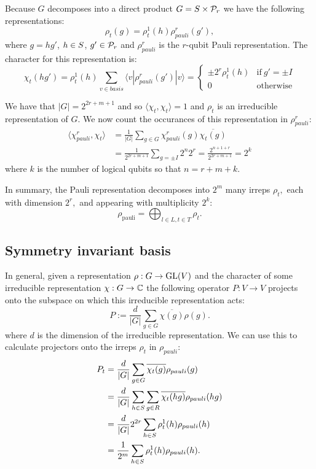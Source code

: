 \documentclass[12pt]{article}
\begin{document}
Because $G$ decomposes 
into a direct product $G=S\times \mathcal{P}_r$ we have the
following representations:
$$
    \rho_t(g) = \rho^1_t(h) \rho^r_{pauli}(g'),
$$
where $g=hg'$, $h\in S$, $g'\in \mathcal{P}_r$ 
and $\rho^r_{pauli}$ is the $r$-qubit Pauli representation.
The character for this representation is:
$$
\chi_{t}(hg') = \rho_t^1(h) \sum_{v \in basis} \langle v | \rho^r_{{pauli}}(g') | v \rangle
    = \left\{ \begin{array}{ll}
 \pm 2^r\rho_t^1(h) &\mbox{if}\ g'=\pm I\\
 0 &\mbox{otherwise}\end{array}\right.
$$

We have that $|G|=2^{2r+m+1}$ and so
$\langle\chi_{t},\chi_{t}\rangle = 1$ and
$\rho_t$ is an irreducible representation of $G.$
We now count the occurances of 
this representation in $\rho^r_{pauli}$:
\begin{align*}
\langle\chi^r_{pauli},\chi_{t}\rangle &= \frac{1}{|G|}\sum_{g\in G} \chi^r_{pauli}(g)\overline{\chi_{t}(g)} \\
&= \frac{1}{2^{2r+m+1}} \sum_{g=\pm I} 2^n 2^r = \frac{2^{n+1+r}}{2^{2r+m+1}} = 2^k
\end{align*}
where $k$ is the number of logical qubits so that $n=r+m+k.$

In summary, the Pauli representation decomposes into 
$2^m$ many irreps $\rho_t,$ 
each with dimension $2^r,$ 
and appearing with multiplicity $2^k:$
$$
    \rho_{\mathrm{pauli}} = \bigoplus_{l\in L, t\in T} \rho_t.
$$

\subsection{Symmetry invariant basis}

In general, given a representation $\rho:G\to \mathrm{GL}(V)$
and the character of some irreducible representation $\chi:G\to \mathbb{C}$
the following operator 
$P:V\to V$
projects onto the subspace on which
this irreducible representation acts:
$$
    P := \frac{d}{|G|} \sum_{g\in G} {\overline{\chi(g)}} \rho(g).
$$
where $d$ is the dimension of the irreducible representation.
We can use this to calculate projectors onto the irreps $\rho_t$ in $\rho_{pauli}$:
\begin{align*}
P_t &= \frac{d}{|G|} \sum_{g\in G} \overline{\chi_t(g)} \rho_{pauli}(g) \\
    &= \frac{d}{|G|} \sum_{h\in S}\sum_{g\in R} \overline{\chi_t(hg)} \rho_{pauli}(hg) \\
    &= \frac{d}{|G|} 2^{2r} \sum_{h\in S} {\rho^1_t(h)} \rho_{pauli}(h) \\
    &= \frac{1}{2^m} \sum_{h\in S} {\rho^1_t(h)} \rho_{pauli}(h).
\end{align*}
\end{document}

